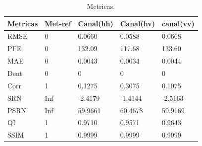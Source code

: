 \documentclass[conference]{IEEEtran}
\begin{document}
\begin{table}[hbt]
	\centering
	\tiny
	\caption{Metricas.}
	\label{cap_acf_tab01}
\begin{tabular}{@{}lllll@{}} \toprule
	Metricas & Met-ref& Canal(hh)& Canal(hv) & canal(vv) \\ \midrule
	RMSE     & 0      & 0.0660  & 0.0588 & 0.0668\\
	PFE      & 0      & 132.09  & 117.68 & 133.60\\
	MAE      & 0      & 0.0043  & 0.0034 & 0.0044\\
	Dent     & 0      & 0       & 0      & 0\\
	Corr     & 1      & 0.1275  & 0.3075 & 0.1075\\
	SRN      & Inf    & -2.4179 &-1.4144 & -2.5163\\
    PSRN     & Inf    &  59.9661& 60.4678& 59.9169\\
	QI       & 1      &  0.9710 & 0.9571 & 0.9643\\ 
    SSIM     & 1      &  0.9999 & 0.9999 & 0.9999\\\bottomrule
\end{tabular}
\end{table}
\end{document}
